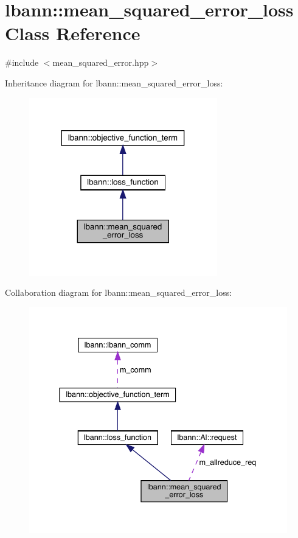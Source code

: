 \hypertarget{classlbann_1_1mean__squared__error__loss}{}\section{lbann\+:\+:mean\+\_\+squared\+\_\+error\+\_\+loss Class Reference}
\label{classlbann_1_1mean__squared__error__loss}


{\ttfamily \#include $<$mean\+\_\+squared\+\_\+error.\+hpp$>$}



Inheritance diagram for lbann\+:\+:mean\+\_\+squared\+\_\+error\+\_\+loss\+:\nopagebreak
\begin{figure}[H]
\begin{center}
\leavevmode
\includegraphics[width=232pt]{classlbann_1_1mean__squared__error__loss__inherit__graph}
\end{center}
\end{figure}


Collaboration diagram for lbann\+:\+:mean\+\_\+squared\+\_\+error\+\_\+loss\+:\nopagebreak
\begin{figure}[H]
\begin{center}
\leavevmode
\includegraphics[width=337pt]{classlbann_1_1mean__squared__error__loss__coll__graph}
\end{center}
\end{figure}
